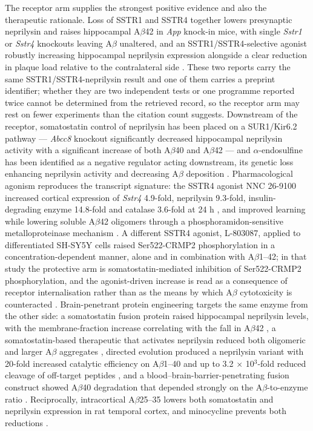 \documentclass[11pt]{article}
\begin{document}
The receptor arm supplies the strongest positive evidence and also the therapeutic rationale. Loss of SSTR1 and SSTR4 together lowers presynaptic neprilysin and raises hippocampal A$\beta$42 in \emph{App} knock-in mice, with single \emph{Sstr1} or \emph{Sstr4} knockouts leaving A$\beta$ unaltered, and an SSTR1/SSTR4-selective agonist robustly increasing hippocampal neprilysin expression alongside a clear reduction in plaque load relative to the contralateral side \citep{Nilsson2020,Nilsson2025}. These two reports carry the same SSTR1/SSTR4-neprilysin result and one of them carries a preprint identifier; whether they are two independent tests or one programme reported twice cannot be determined from the retrieved record, so the receptor arm may rest on fewer experiments than the citation count suggests. Downstream of the receptor, somatostatin control of neprilysin has been placed on a SUR1/Kir6.2 pathway --- \emph{Abcc8} knockout significantly decreased hippocampal neprilysin activity with a significant increase of both A$\beta$40 and A$\beta$42 \citep{Watamura2021} --- and $\alpha$-endosulfine has been identified as a negative regulator acting downstream, its genetic loss enhancing neprilysin activity and decreasing A$\beta$ deposition \citep{Watamura2020}. Pharmacological agonism reproduces the transcript signature: the SSTR4 agonist NNC 26-9100 increased cortical expression of \emph{Sstr4} 4.9-fold, neprilysin 9.3-fold, insulin-degrading enzyme 14.8-fold and catalase 3.6-fold at 24 h \citep{Sandoval2019}, and improved learning while lowering soluble A$\beta$42 oligomers through a phosphoramidon-sensitive metalloproteinase mechanism \citep{Sandoval2013}. A different SSTR4 agonist, L-803087, applied to differentiated SH-SY5Y cells raised Ser522-CRMP2 phosphorylation in a concentration-dependent manner, alone and in combination with A$\beta$1--42; in that study the protective arm is somatostatin-mediated inhibition of Ser522-CRMP2 phosphorylation, and the agonist-driven increase is read as a consequence of receptor internalisation rather than as the means by which A$\beta$ cytotoxicity is counteracted \citep{Paik2021}. Brain-penetrant protein engineering targets the same enzyme from the other side: a somatostatin fusion protein raised hippocampal neprilysin levels, with the membrane-fraction increase correlating with the fall in A$\beta$42 \citep{Rofo2021}, a somatostatin-based therapeutic that activates neprilysin reduced both oligomeric and larger A$\beta$ aggregates \citep{Metzendorf2025}, directed evolution produced a neprilysin variant with 20-fold increased catalytic efficiency on A$\beta$1--40 and up to 3.2 $\times$ 10$^{3}$-fold reduced cleavage of off-target peptides \citep{Webster2014}, and a blood--brain-barrier-penetrating fusion construct showed A$\beta$40 degradation that depended strongly on the A$\beta$-to-enzyme ratio \citep{Rofo2022}. Reciprocally, intracortical A$\beta$25--35 lowers both somatostatin and neprilysin expression in rat temporal cortex, and minocycline prevents both reductions \citep{BurgosRamos2009}.
\end{document}
